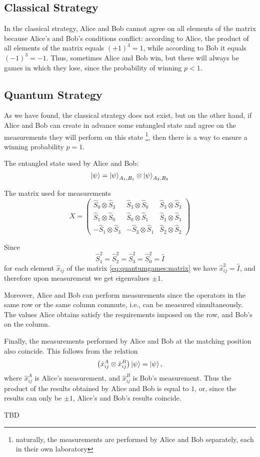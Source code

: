 \subsection{Classical Strategy}
In the classical strategy, Alice and Bob cannot agree on all
elements of the matrix because Alice's and Bob's conditions conflict:
according to Alice, the product of all elements of the matrix
equals $(+1)^3 = 1$, while according to Bob it equals $(-1)^3 = -1$.
Thus, sometimes Alice and Bob win, but there will always be games in which
they lose, since the probability of winning $p < 1$.

\subsection{Quantum Strategy}
As we have found, the classical strategy does not exist, but on the other
hand, if Alice and Bob can create in advance some
entangled state and agree on the measurements they
will perform on this state
\footnote{
naturally, the measurements are performed by Alice and Bob separately, each in their own laboratory
}, then there is a way to ensure a winning probability $p=1$.

The entangled state used by Alice and Bob:
\begin{equation}
\ket{\psi} = \ket{\psi}_{A_1,B_1} \otimes \ket{\psi}_{A_2,B_2}
\nonumber
\end{equation}

The matrix used for measurements
\begin{equation}
X =
\left(
\begin{array}{ccc}
\hat{S}_0 \otimes \hat{S}_3 & \hat{S}_3 \otimes \hat{S}_0 & \hat{S}_3 \otimes \hat{S}_3 \\
\hat{S}_1 \otimes \hat{S}_0 & \hat{S}_0 \otimes \hat{S}_1 & \hat{S}_1 \otimes \hat{S}_1 \\
- \hat{S}_1 \otimes \hat{S}_3 & - \hat{S}_3 \otimes \hat{S}_1 & \hat{S}_2 \otimes \hat{S}_2  
\end{array}
\right)
\label{eq:quantumgames:matrix}
\end{equation}

Since 
\[
\hat{S}_1^2 = \hat{S}_2^2 = \hat{S}_3^2 = \hat{S}_0^2 = \hat{I}
\]
for each element $\hat{x}_{ij}$ of the matrix
\eqref{eq:quantumgames:matrix} we have $\hat{x}_{ij}^2 = \hat{I}$, and
therefore upon measurement we get eigenvalues $\pm 1$.

Moreover, Alice and Bob can perform measurements since the operators in
the same row or the same column commute, i.e., can be measured
simultaneously. The values Alice obtains satisfy
the requirements imposed on the row, and Bob's on the column.

Finally, the measurements performed by Alice and Bob at the matching
position also coincide. This follows from the relation
\[
\left(\hat{x}_{ij}^A \otimes \hat{x}_{ij}^B\right) \ket{\psi} = \ket{\psi},
\]
where $\hat{x}_{ij}^A$ is Alice's measurement, and $\hat{x}_{ij}^B$ is Bob's measurement. Thus the product of the results obtained by Alice and Bob
is equal to $1$, or, since the results can only be $\pm 1$, Alice's and Bob's results coincide. 


TBD

